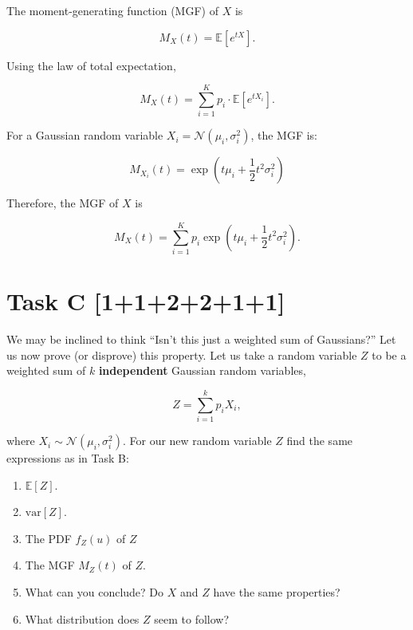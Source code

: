 The moment-generating function (MGF) of $X$ is

\begin{equation*}
    M_X(t) = \mathbb{E}[e^{tX}].
\end{equation*}

Using the law of total expectation,

\begin{equation*}
    M_X(t) = \sum_{i=1}^{K} p_i \cdot \mathbb{E}[e^{tX_i}].
\end{equation*}

For a Gaussian random variable $X_i=\mathcal{N}(\mu_i, \sigma_i^2)$, the MGF is:

\begin{equation*}
    M_{X_i}(t) = \exp\left(t\mu_i + \frac{1}{2}t^2\sigma_i^2\right)
\end{equation*}

Therefore, the MGF of $X$ is

\begin{equation*}
    M_X(t) = \sum_{i=1}^{K} p_i \exp\left(t\mu_i+\frac{1}{2}t^2\sigma_i^2\right).
\end{equation*}

\section*{\colS{$\S$} Task C \hfill \normalfont \large [1+1+2+2+1+1]}

\begin{tcolorbox}
    We may be inclined to think \enquote{Isn't this just a weighted sum of
    Gaussians?} Let us now prove (or disprove) this property. Let us take a random
    variable $Z$ to be a weighted sum of $k$ \textbf{independent} Gaussian random
    variables,

    \begin{equation*}
        Z = \sum_{i = 1}^k p_i X_i,
    \end{equation*}

    where $X_i \sim \mathcal{N}(\mu_i, \sigma_i^2)$. For our new random variable
    $Z$ find the same expressions as in Task B:

    \vspace{10pt}
    \begin{enumerate}
        \item $\mathbb{E}[Z]$.
        \item $\text{var}[Z]$.
        \item The PDF $f_Z(u)$ of $Z$
        \item The MGF $M_Z(t)$ of $Z$.
        \item What can you conclude? Do $X$ and $Z$ have the same properties?
        \item What distribution does $Z$ seem to follow?
    \end{enumerate}
\end{tcolorbox}

